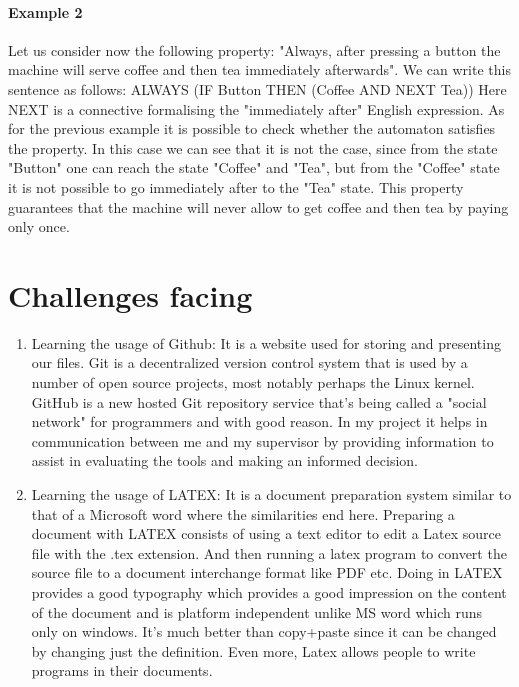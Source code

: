 \documentclass{article}
\begin{document}
\paragraph{Example 2}

Let us consider now the following property: "Always, after pressing a button the machine will serve coffee and then tea immediately afterwards". We can write this sentence as follows:
ALWAYS (IF Button THEN (Coffee AND NEXT Tea))
Here NEXT is a connective formalising the "immediately after" English expression. As for the previous example it is possible to check whether the automaton satisfies the property. In this case we can see that it is not the case, since from the state "Button" one can reach the state "Coffee" and "Tea", but from the "Coffee" state it is not possible to go immediately after to the "Tea" state. This property guarantees that the machine will never allow to get coffee and then tea by paying only once.



\section{Challenges facing}
\label{sec:challenges}

\begin{enumerate}

\item Learning the usage of Github: It is a website used for storing and presenting our files. Git is a decentralized version control system that is used by a number of open source projects, most notably perhaps the Linux kernel. GitHub is a new hosted Git repository service that's being called a "social network" for programmers and with good reason. In my project it helps in communication between me and my supervisor by providing information to assist in evaluating the tools and making an informed decision.

\item Learning the usage of LATEX: It is a document preparation system similar to that of a Microsoft word where the similarities end here. Preparing a document with LATEX consists of using a text editor to edit a Latex source file with the .tex extension. And then running a latex program to convert the source file to a document interchange format like PDF etc. Doing in LATEX provides a good typography which provides a good impression on the content of the document and is platform independent unlike MS word which runs only on windows. It's much better than copy+paste since it can be changed by changing just the definition. Even more, Latex allows people to write programs in their documents.

\end{enumerate}
\end{document}
